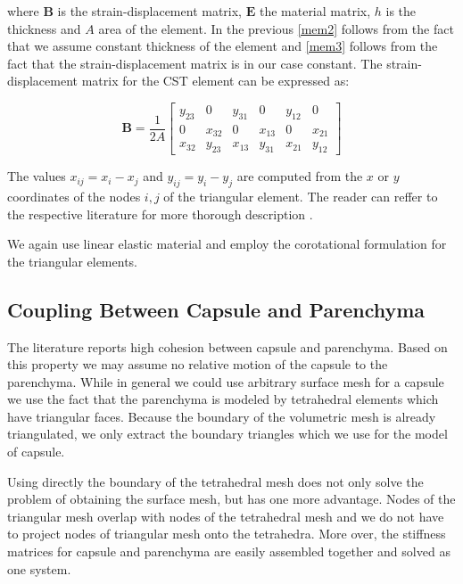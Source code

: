 \documentclass{llncs}
\newcommand{\Mat}[1]{\mathbf{#1}}
\begin{document}
where $\Mat{B}$ is the strain-displacement matrix, $\Mat{E}$ the material
matrix, $h$ is the thickness and $A$ area of the element. In the previous
\eqref{mem2} follows from the fact that we assume constant thickness of the
element and \eqref{mem3} follows from the fact that the strain-displacement
matrix is in our case constant. The strain-displacement matrix for the CST
element can be expressed as:

\begin{equation}
  \Mat{B} = \frac{1}{2A} \begin{bmatrix}
    y_{23} & 0      & y_{31} & 0      & y_{12} & 0 \\
         0 & x_{32} & 0      & x_{13} & 0      & x_{21} \\
    x_{32} & y_{23} & x_{13} & y_{31} & x_{21} & y_{12}
  \end{bmatrix}
\end{equation}

The values $x_{ij} = x_i - x_j$ and $y_{ij} = y_i - y_j$ are computed from
the $x$ or $y$ coordinates of the nodes $i,j$ of the triangular element.
The reader can reffer to the respective literature for more thorough
description \cite{Felippa2003}.

We again use linear elastic material and employ the corotational formulation
for the triangular elements.


\subsection{Coupling Between Capsule and Parenchyma} %

The literature reports high cohesion between capsule and parenchyma.
Based on this
property we may assume no relative motion of the capsule to the parenchyma.
While in general we could use arbitrary surface mesh for a capsule we use
the fact that the parenchyma is modeled by tetrahedral elements which have
triangular faces. Because the boundary of the volumetric mesh is already
triangulated, we only extract the boundary triangles which we use for the
model of capsule.

Using directly the boundary of the tetrahedral mesh does not only solve the
problem of obtaining the surface mesh, but has one more advantage. Nodes
of the triangular mesh overlap with nodes of the tetrahedral mesh and we do
not have to project nodes of triangular mesh onto the tetrahedra. More over,
the stiffness matrices for capsule and parenchyma are easily assembled
together and solved as one system.
\end{document}
